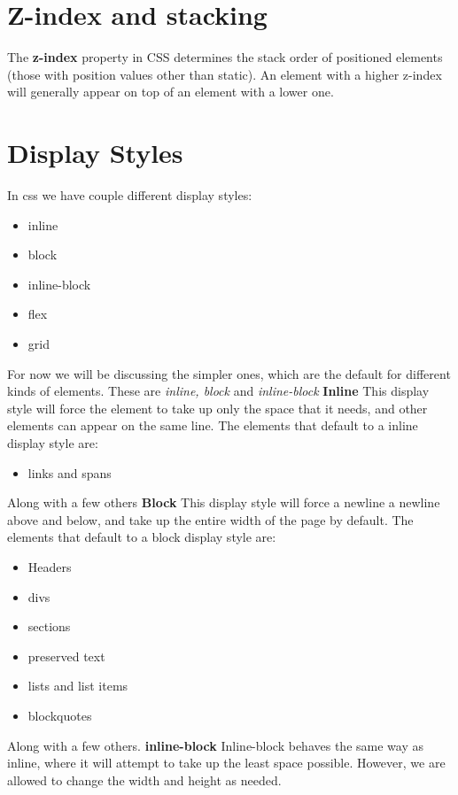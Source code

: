 \documentclass{report}
\begin{document}
    \bigbreak \noindent 
    \section{\LARGE Z-index and stacking}
    \bigbreak \noindent 
    The \textbf{z-index} property in CSS determines the stack order of positioned elements (those with position values other than static). An element with a higher z-index will generally appear on top of an element with a lower one.
    \bigbreak \noindent 

    \pagebreak \bigbreak \noindent 
    \section{\LARGE Display Styles}
    \bigbreak \noindent 
    In css we have couple different display styles:
    \begin{itemize}
        \item inline
        \item block
        \item inline-block
        \item flex
        \item grid
    \end{itemize}
    \bigbreak \noindent 
    For now we will be discussing the simpler ones, which are the default for different kinds of elements. These are \textit{inline, block} and \textit{inline-block} 
    \bigbreak \noindent 
    \textbf{Inline}
    \bigbreak \noindent 
    This display style will force the element to take up only the space that it needs, and other elements can appear on the same line.
    \bigbreak \noindent 
    The elements that default to a inline display style are:
    \begin{itemize}
        \item links and spans
    \end{itemize}
    \bigbreak \noindent 
    Along with a few others
    \bigbreak \noindent 
    \textbf{Block} 
    \bigbreak \noindent 
    This display style will force a newline a newline above and below, and take up the entire width of the page by default.
    \bigbreak \noindent 
    The elements that default to a block display style are:
    \begin{itemize}
        \item Headers
        \item divs
        \item sections
        \item preserved text
        \item lists and list items
        \item blockquotes
    \end{itemize}
    Along with a few others.
    \bigbreak \noindent 
    \textbf{inline-block}
    \bigbreak \noindent 
    Inline-block behaves the same way as inline, where it will attempt to take up the least space possible. However, we are allowed to change the width and height as needed.
    \bigbreak \noindent 
\end{document}
